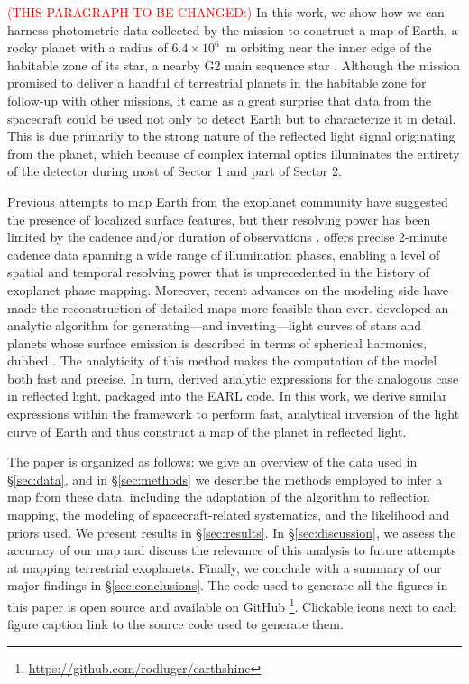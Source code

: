 \documentclass[modern]{aastex62}
\newcommand{\todo}[1]{\textcolor{red}{#1}}
\begin{document}
\todo{(THIS PARAGRAPH TO BE CHANGED:)} 
In this work, we show how we can harness photometric data collected by the \TESS mission
to construct a map of Earth, a rocky planet with a radius of $6.4\times 10^6$~m
orbiting near the inner edge of the habitable zone of its star, a nearby G2 main sequence
star \citep{Sagan1993}. Although the \TESS mission promised to deliver a handful of terrestrial planets in 
the habitable zone for follow-up with other missions, it came as a great surprise
that data from the spacecraft could be used not only to detect Earth but to
characterize it in detail. This is due primarily to the strong nature of the reflected
light signal originating from the planet, which 
because of complex internal optics illuminates the entirety of the \TESS detector 
during most of Sector 1 and part of Sector 2.

Previous attempts to map Earth from the exoplanet community have suggested 
the presence of localized surface features, but their resolving power has been 
limited by the cadence and/or duration of observations \citep{Cowan2009,Jiang2018}. 
\TESS offers precise 2-minute cadence data spanning a wide range of illumination 
phases, enabling a level of spatial and temporal resolving power that is 
unprecedented in the history of exoplanet phase mapping. 
%
Moreover, recent advances on the modeling side 
have made the reconstruction of detailed maps more feasible than ever. 
\cite{Luger2019} developed an analytic algorithm for generating---and
inverting---light curves of stars and planets whose surface emission is
described in terms of spherical harmonics, dubbed \starry. The analyticity of this
method makes the computation of the model both fast and precise.
In turn, \cite{Haggard2018} derived analytic expressions for the
analogous case in reflected light, packaged into the 
\textsf{EARL} code. In this work, we derive similar expressions within
the \starry framework to perform fast, analytical inversion of the light curve
of Earth and thus construct a map of the planet in reflected light.

The paper is organized as follows: we give an overview of the \TESS data used in \S\ref{sec:data},
and in \S\ref{sec:methods} we describe the methods employed to infer a map 
from these data, including the adaptation of the \starry algorithm to reflection 
mapping, the modeling of spacecraft-related systematics, and the likelihood and 
priors used. 
We present results in \S\ref{sec:results}. 
In \S\ref{sec:discussion}, we assess the accuracy of our map and discuss the relevance 
of this analysis to future attempts at mapping terrestrial exoplanets.
Finally, we conclude with a summary of our major findings in \S\ref{sec:conclusions}.
The code used to generate all the figures in this paper is open source
and available on GitHub%
\footnote{\url{https://github.com/rodluger/earthshine}}. Clickable icons
\href{https://github.com/rodluger/earthshine}{\color{linkcolor}\faFileCodeO}
next to each figure caption 
link to the source code used to generate them.
\end{document}

